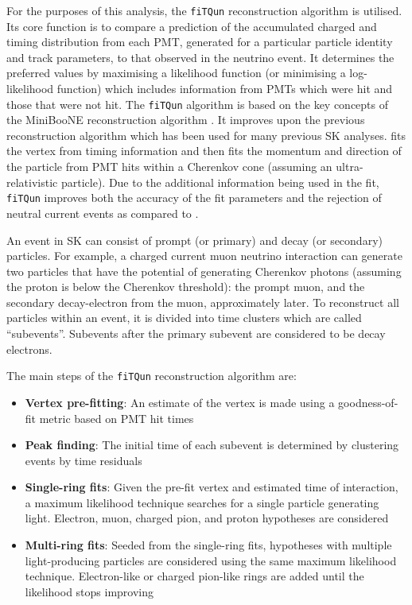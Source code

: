 For the purposes of this analysis, the \texttt{fiTQun} reconstruction algorithm \cite{t2k_tn_146} is utilised. Its core function is to compare a prediction of the accumulated charged and timing distribution from each PMT, generated for a particular particle identity and track parameters, to that observed in the neutrino event. It determines the preferred values by maximising a likelihood function (or minimising a log-likelihood function) which includes information from PMTs which were hit and those that were not hit. The \texttt{fiTQun} algorithm is based on the key concepts of the MiniBooNE reconstruction algorithm \cite{Patterson_2009}. It improves upon the previous \apfit reconstruction algorithm which has been used for many previous SK analyses. \apfit fits the vertex from timing information and then fits the momentum and direction of the particle from PMT hits within a \quickmath{43\deg} Cherenkov cone (assuming an ultra-relativistic particle). Due to the additional information being used in the fit, \texttt{fiTQun} improves both the accuracy of the fit parameters and the rejection of neutral current  events as compared to \apfit \cite{Abe2018, Abe2015}.

An event in SK can consist of prompt (or primary) and decay (or secondary) particles. For example, a charged current muon neutrino interaction can generate two particles that have the potential of generating Cherenkov photons (assuming the proton is below the Cherenkov threshold): the prompt muon, and the secondary decay-electron from the muon, approximately  later. To reconstruct all particles within an event, it is divided into time clusters which are called ``subevents''. Subevents after the primary subevent are considered to be decay electrons.

The main steps of the \texttt{fiTQun} reconstruction algorithm are:

\begin{itemize}
\item \textbf{Vertex pre-fitting}: An estimate of the vertex is made using a goodness-of-fit metric based on PMT hit times
\item \textbf{Peak finding}: The initial time of each subevent is determined by clustering events by time residuals
\item \textbf{Single-ring fits}: Given the pre-fit vertex and estimated time of interaction, a maximum likelihood technique searches for a single particle generating light. Electron, muon, charged pion, and proton hypotheses are considered
\item \textbf{Multi-ring fits}: Seeded from the single-ring fits, hypotheses with multiple light-producing particles are considered using the same maximum likelihood technique. Electron-like or charged pion-like rings are added until the likelihood stops improving
\end{itemize}


